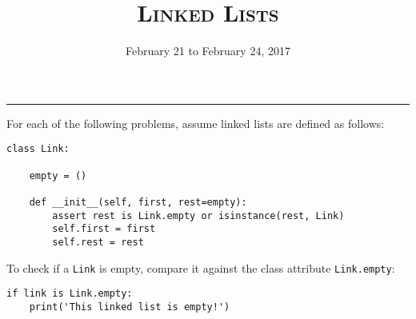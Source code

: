 \documentclass{exam}
\title{\textsc{Linked Lists}}
\date{February 21 to February 24, 2017}
\begin{document}
\maketitle
\rule{\textwidth}{0.15em}
\fontsize{12}{15}\selectfont




\begin{blocksection}
For each of the following problems, assume linked lists are defined as follows:
\newline
\begin{lstlisting}
class Link:

    empty = ()

    def __init__(self, first, rest=empty):
        assert rest is Link.empty or isinstance(rest, Link)
        self.first = first
        self.rest = rest
\end{lstlisting}

To check if a \texttt{Link} is empty, compare it against the class attribute \texttt{Link.empty}:
\newline
\begin{lstlisting}
if link is Link.empty:
    print('This linked list is empty!')
\end{lstlisting}
\end{blocksection}
\end{document}
